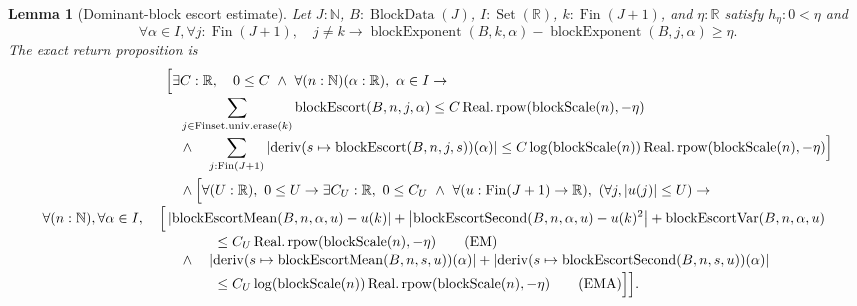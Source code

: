 \documentclass[9pt]{extarticle}
\newtheorem{lemma}{Lemma}[section]
\theoremstyle{definition}
\theoremstyle{remark}
\newcommand{\R}{\mathbb R}
\newcommand{\N}{\mathbb N}
\newcommand{\abs}[1]{\left\lvert #1\right\rvert}
\begin{document}
\begin{lemma}[Dominant-block escort estimate]\label{lem:dominant-block}
Let $J:\N$, $B:\operatorname{BlockData}(J)$,
$I:\operatorname{Set}(\R)$, $k:\operatorname{Fin}(J+1)$, and
$\eta:\R$ satisfy $h_\eta:0<\eta$ and
\begin{equation}
 \forall\alpha\in I,\forall j:\operatorname{Fin}(J+1),\quad
 j\neq k\to
 \operatorname{blockExponent}(B,k,\alpha)
 -\operatorname{blockExponent}(B,j,\alpha)\geq\eta.
 \label{eq:dominant-gap}
\end{equation}
The exact return proposition is
\begin{align}
&\Bigl[\exists C:\R,\quad0\leq C\ \wedge\
 \forall(n:\N)(\alpha:\R),\ \alpha\in I\to\\[-2pt]
&\quad
 \sum_{j\in\operatorname{Finset.univ.erase}(k)}
   \operatorname{blockEscort}(B,n,j,\alpha)
 \leq C\operatorname{Real.rpow}(\operatorname{blockScale}(n),-\eta)
 \label{eq:escort-outside}\\[-2pt]
&\quad\wedge\quad
 \sum_{j:\operatorname{Fin}(J+1)}
  \abs{\operatorname{deriv}
   (s\mapsto\operatorname{blockEscort}(B,n,j,s))(\alpha)}
 \leq C\log(\operatorname{blockScale}(n))
       \operatorname{Real.rpow}(\operatorname{blockScale}(n),-\eta)
 \Bigr]\label{eq:escort-alpha-derivative}\\
&\quad\wedge\Bigl[
 \forall(U:\R),\ 0\leq U\to
 \exists C_U:\R,\ 0\leq C_U\ \wedge\
 \forall(u:\operatorname{Fin}(J+1)\to\R),\
 (\forall j,\abs{u(j)}\leq U)\to\\[-2pt]
 \forall(n:\N),\forall\alpha\in I,\quad
 \Bigl[
 &\abs{\operatorname{blockEscortMean}(B,n,\alpha,u)-u(k)}
 +\abs{\operatorname{blockEscortSecond}(B,n,\alpha,u)-u(k)^2}
 +\operatorname{blockEscortVar}(B,n,\alpha,u)\\[-2pt]
 &\hspace{12mm}\leq
 C_U\operatorname{Real.rpow}(\operatorname{blockScale}(n),-\eta)
 \tag{EM}\label{eq:escort-moment-bound}\\[-2pt]
 &\quad\wedge\quad
 \abs{\operatorname{deriv}
  (s\mapsto\operatorname{blockEscortMean}(B,n,s,u))(\alpha)}
 +\abs{\operatorname{deriv}
  (s\mapsto\operatorname{blockEscortSecond}(B,n,s,u))(\alpha)}\\[-2pt]
 &\hspace{12mm}\leq C_U\log(\operatorname{blockScale}(n))
   \operatorname{Real.rpow}(\operatorname{blockScale}(n),-\eta)
 \tag{EMA}\label{eq:escort-moment-alpha}
 \Bigr]\Bigr].
\end{align}
\end{lemma}
\end{document}
